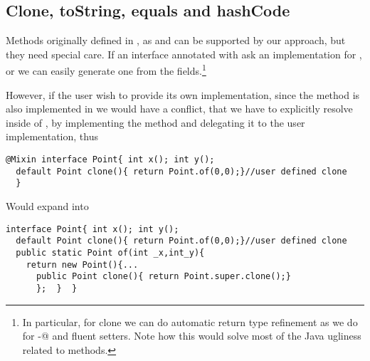 \subsection{Clone, toString, equals and hashCode}
Methods originally defined in \Q@Object@, as \Q@clone@ and \Q@toString@ can be supported by our approach, but they need special care. If an interface annotated with \mixin ask an implementation for \Q@clone@, \Q@toString@ \Q@equls@ or \Q@hashCode@ we can easily generate one from the fields.\footnote{In particular, for clone we can do automatic return type refinement as we do for \Q@with-@ and fluent setters. Note how this would solve most of the Java ugliness related to \Q@clone@ methods.}

However, if the user wish to provide its own implementation, since the method is also implemented in \Q@Object@ we would have a conflict, that we have to explicitly resolve inside of \Q@of@, by implementing the method and delegating it to the user implementation, thus

\begin{lstlisting}
@Mixin interface Point{ int x(); int y();
  default Point clone(){ return Point.of(0,0);}//user defined clone
  }
\end{lstlisting} 
Would expand into 

\begin{lstlisting}
interface Point{ int x(); int y();
  default Point clone(){ return Point.of(0,0);}//user defined clone
  public static Point of(int _x,int_y){
    return new Point(){...
      public Point clone(){ return Point.super.clone();}
      };  }  }
\end{lstlisting} 
